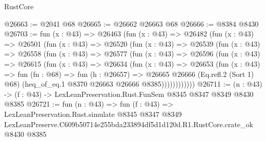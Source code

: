 \begin{lexlean}{RustCore}
\begin{coremodule}
@26663 := @2041 @68
@26665 := @26662 @26663 @68
@26666 := @8384 @8430
@26703 := fun (x : @43) =>
  @26463
    (fun (x : @43) =>
    @26482
      (fun (x : @43) =>
      @26501
        (fun (x : @43) =>
        @26520
          (fun (x : @43) =>
          @26539
            (fun (x : @43) =>
            @26558
              (fun (x : @43) =>
              @26577
                (fun (x : @43) =>
                @26596
                  (fun (x : @43) =>
                  @26615
                    (fun (x : @43) =>
                    @26634
                      (fun (x : @43) =>
                      @26653
                        (fun (x : @43) =>
                        fun (fn : @68) =>
                        fun (h : @26657) =>
                        @26665
                          @26666
                          (Eq.refl.{2} (Sort 1) @68)
                          (heq_of_eq.{1} @8370 @26663 @26666 @8385))))))))))))
@26711 := (n : @43) -> (f : @43) -> LexLeanPreservation.Rust.FunSem @8345 @8347 @8349 @8430 @8385
@26721 := fun (n : @43) =>
  fun (f : @43) =>
  LexLeanPreservation.Rust.simulate
    @8345
    @8347
    @8349
    LexLeanPreserve.C609b50714e255bda233894df5d1d120d.R1.RustCore.crate_ok
    @8430
    @8385
\end{coremodule}
\end{lexlean}
